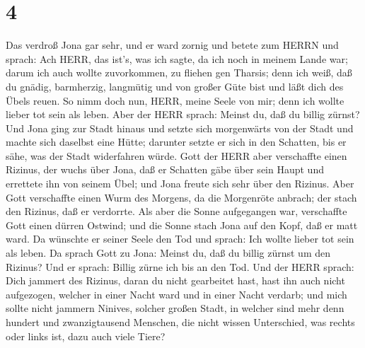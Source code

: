 \hypertarget{section-3}{%
\section{4}\label{section-3}}

 Das verdroß Jona gar sehr, und er ward zornig 
und betete zum HERRN und sprach: Ach HERR, das ist's, was ich sagte, da
ich noch in meinem Lande war; darum ich auch wollte zuvorkommen, zu
fliehen gen Tharsis; denn ich weiß, daß du gnädig, barmherzig, langmütig
und von großer Güte bist und läßt dich des Übels reuen.  So
nimm doch nun, HERR, meine Seele von mir; denn ich wollte lieber tot
sein als leben.  Aber der HERR sprach: Meinst du, daß du
billig zürnst?  Und Jona ging zur Stadt hinaus und setzte
sich morgenwärts von der Stadt und machte sich daselbst eine Hütte;
darunter setzte er sich in den Schatten, bis er sähe, was der Stadt
widerfahren würde.  Gott der HERR aber verschaffte einen
Rizinus, der wuchs über Jona, daß er Schatten gäbe über sein Haupt und
errettete ihn von seinem Übel; und Jona freute sich sehr über den
Rizinus.  Aber Gott verschaffte einen Wurm des Morgens, da
die Morgenröte anbrach; der stach den Rizinus, daß er verdorrte.
 Als aber die Sonne aufgegangen war, verschaffte Gott einen
dürren Ostwind; und die Sonne stach Jona auf den Kopf, daß er matt ward.
Da wünschte er seiner Seele den Tod und sprach: Ich wollte lieber tot
sein als leben.  Da sprach Gott zu Jona: Meinst du, daß du
billig zürnst um den Rizinus? Und er sprach: Billig zürne ich bis an den
Tod.  Und der HERR sprach: Dich jammert des Rizinus, daran
du nicht gearbeitet hast, hast ihn auch nicht aufgezogen, welcher in
einer Nacht ward und in einer Nacht verdarb;  und mich
sollte nicht jammern Ninives, solcher großen Stadt, in welcher sind mehr
denn hundert und zwanzigtausend Menschen, die nicht wissen Unterschied,
was rechts oder links ist, dazu auch viele Tiere?
